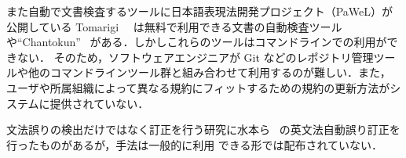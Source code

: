 \documentclass[a4paper, 10pt]{jarticle}
\begin{document}
また自動で文書検査するツールに日本語表現法開発プロジェクト（PaWeL）が公開している Tomarigi~\cite{tomarigi}~\cite{tomarigi-paper} 
は無料で利用できる文書の自動検査ツールや``Chantokun''~\cite{chantokun} がある．しかしこれらのツールはコマンドラインでの利用ができない．
そのため，ソフトウェアエンジニアが Git などのレポジトリ管理ツールや他のコマンドラインツール群と組み合わせて利用するのが難しい．また，
ユーザや所属組織によって異なる規約にフィットするための規約の更新方法がシステムに提供されていない．

文法誤りの検出だけではなく訂正を行う研究に水本ら~\cite{mizumoto12english} の英文法自動誤り訂正を行ったものがあるが，手法は一般的に利用
できる形では配布されていない．




\end{document}
